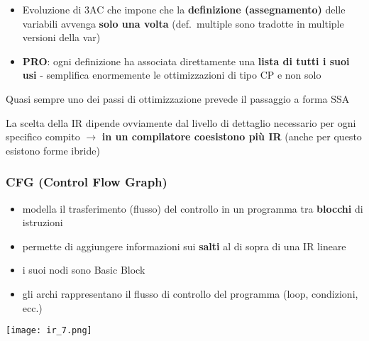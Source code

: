 \begin{itemize}
  \item Evoluzione di 3AC che impone che la \textbf{definizione (assegnamento)} delle variabili avvenga \textbf{solo una volta} (def.~multiple sono tradotte in multiple versioni della var)
  \item \textbf{PRO}: ogni definizione ha associata direttamente una \textbf{lista di tutti i suoi usi} - semplifica enormemente le ottimizzazioni di tipo CP e non solo
\end{itemize}


\begin{emphasize}
  Quasi sempre uno dei passi di ottimizzazione prevede il passaggio a forma SSA
\end{emphasize}

\begin{emphasize}
  La scelta della IR dipende ovviamente dal livello di dettaglio necessario per ogni specifico compito $\rightarrow$ \textbf{in un compilatore coesistono pi\`u IR} (anche per questo esistono forme ibride)
\end{emphasize}

\subsubsection{CFG (Control Flow Graph)}

\noindent\begin{minipage}[c]{.65\textwidth}
  \begin{itemize}
    \item modella il trasferimento (flusso) del controllo in un programma tra \textbf{blocchi} di istruzioni
    \item permette di aggiungere informazioni sui \textbf{salti} al di sopra di una IR lineare
    \item i suoi nodi sono Basic Block
    \item gli archi rappresentano il flusso di controllo del programma (loop, condizioni, ecc.)
  \end{itemize}
\end{minipage}
\begin{minipage}[c]{.35\textwidth}
  \texttt{[image: ir\_7.png]}
\end{minipage}

